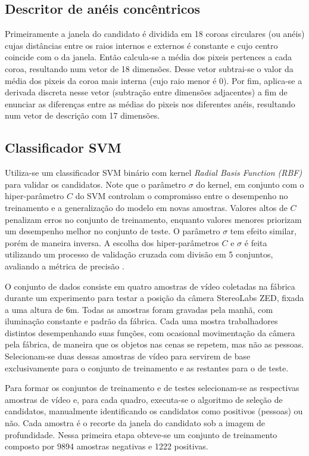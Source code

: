     \subsection{Descritor de anéis concêntricos}
       Primeiramente a janela do candidato é dividida em 18 coroas circulares (ou anéis) cujas distâncias entre os raios internos e externos é constante e cujo centro coincide com o da janela. Então calcula-se a média dos pixeis pertences a cada coroa, resultando num vetor de 18 dimensões. Desse vetor subtrai-se o valor da média dos pixeis da coroa mais interna (cujo raio menor é 0). Por fim, aplica-se a derivada discreta nesse vetor (subtração entre dimensões adjacentes) a fim de enunciar as diferenças entre as médias do pixeis nos diferentes anéis, resultando num vetor de descrição com 17 dimensões.

    \subsection{Classificador SVM}
      Utiliza-se um classificador SVM binário com kernel \textit{Radial Basis Function (RBF)} \cite{rbfkernel} para validar os candidatos. Note que o parâmetro $\sigma$ do kernel, em conjunto com o hiper-parâmetro $C$ do SVM controlam o compromisso entre o desempenho no treinamento e a generalização do modelo em novas amostras. Valores altos de $C$ penalizam erros no conjunto de treinamento, enquanto valores menores priorizam um desempenho melhor no conjunto de teste. O parâmetro $\sigma$ tem efeito similar, porém de maneira inversa. A escolha dos hiper-parâmetros $C$ e $\sigma$ é feita utilizando um processo de validação cruzada com divisão em 5 conjuntos, avaliando a métrica de precisão \cite{evaluationMetrics}.

      O conjunto de dados consiste em quatro amostras de vídeo coletadas na fábrica durante um experimento para testar a posição da câmera StereoLabs ZED, fixada a uma altura de 6m. Todas as amostras foram gravadas pela manhã, com iluminação constante e padrão da fábrica. Cada uma mostra trabalhadores distintos desempenhando suas funções, com ocasional movimentação da câmera pela fábrica, de maneira que os objetos nas cenas se repetem, mas não as pessoas. Selecionam-se duas dessas amostras de vídeo para servirem de base exclusivamente para o conjunto de treinamento e as restantes para o de teste.

      Para formar os conjuntos de treinamento e de testes selecionam-se as respectivas amostras de vídeo e, para cada quadro, executa-se o algoritmo de seleção de candidatos, manualmente identificando os candidatos como positivos (pessoas) ou não.  Cada amostra é o recorte da janela do candidato sob a imagem de profundidade. Nessa primeira etapa obteve-se um conjunto de treinamento composto por 9894 amostras negativas e 1222 positivas.

